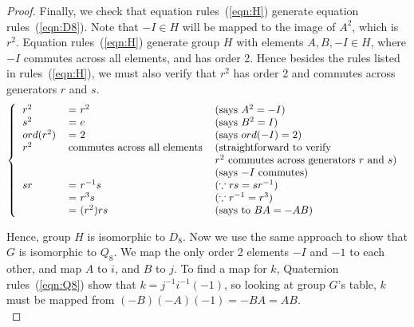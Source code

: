 \documentclass{article}
\begin{document}
\begin{enumerate}
\begin{enumerate}
\begin{proof}
          Finally, we check that equation rules~(\ref{eqn:H}) generate
          equation rules~(\ref{eqn:D8}). Note that $-I\in H$ will be mapped
          to the image of $A^2$, which is $r^2$. Equation
          rules~(\ref{eqn:H}) generate group $H$ with elements $A,B,-I\in
          H$, where $-I$ commutes across all elements, and has order 2.
          Hence besides the rules listed in rules~(\ref{eqn:H}), we must
          also verify that $r^2$ has order 2 and commutes across generators
          $r$ and $s$.
          \[\left \{
            \begin{tabular}{lll}
              $r^2$ & = $r^2$       & (says $A^2=-I$) \\
              $s^2$ & = $e$         & (says $B^2=I$) \\
              $ord(r^2)$ & = $2$    & (says $ord(-I)=2$) \\
              $r^2$ & commutes across all elements & (straightforward to verify \\
                    &               & $r^2$ commutes across generators $r$ and $s$) \\
                    &               & (says $-I$ commutes) \\
              $sr$  & = $r^{-1}s$   & ($\because rs=sr^{-1}$) \\
                    & = $r^3s$      & ($\because r^{-1}=r^3$) \\
                    & = $(r^2)rs$   & (says to $BA=-AB$) \\
            \end{tabular}
          \right .\ \]

          Hence, group $H$ is isomorphic to $D_8$. Now we use the same
          approach to show that $G$ is isomorphic to $Q_8$. We map the
          only order 2 elements $-I$ and $-1$ to each other, and map $A$ to
          $i$, and $B$ to $j$. To find a map for $k$, Quaternion
          rules~(\ref{eqn:Q8}) show that $k=j^{-1}i^{-1}(-1)$, so looking at
          group $G$'s table, $k$ must be mapped from $(-B)(-A)(-1)=-BA=AB$.
          \\


\end{proof}
\end{enumerate}
\end{enumerate}
\end{document}
